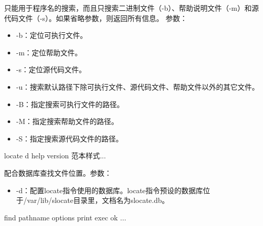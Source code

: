\documentclass[letterpaper,10pt,english]{sphinxmanual}
\begin{document}
只能用于程序名的搜索，而且只搜索二进制文件（-b）、帮助说明文件（-m）和源代码文件（-s）。如果省略参数，则返回所有信息。
参数：
\begin{itemize}
\item {} 
-b：定位可执行文件。

\item {} 
-m：定位帮助文件。

\item {} 
-s：定位源代码文件。

\item {} 
-u：搜索默认路径下除可执行文件、源代码文件、帮助文件以外的其它文件。

\item {} 
-B：指定搜索可执行文件的路径。

\item {} 
-M：指定搜索帮助文件的路径。

\item {} 
-S：指定搜索源代码文件的路径。

\end{itemize}


%
\begin{sphinxVerbatim}[commandchars=\\\{\}]
locate \PYG{o}{[}\PYGZhy{}d\PYG{o}{]} \PYG{o}{[}\PYGZhy{}\PYGZhy{}help\PYG{o}{]} \PYG{o}{[}\PYGZhy{}\PYGZhy{}version\PYG{o}{]} \PYG{o}{[}范本样式...\PYG{o}{]}
\end{sphinxVerbatim}

配合数据库查找文件位置。参数：
\begin{itemize}
\item {} 
-d：配置locate指令使用的数据库。locate指令预设的数据库位于/var/lib/slocate目录里，文档名为slocate.db。

\end{itemize}


%
\begin{sphinxVerbatim}[commandchars=\\\{\}]
find pathname \PYGZhy{}options \PYG{o}{[}\PYGZhy{}print \PYGZhy{}exec \PYGZhy{}ok ...\PYG{o}{]}
\end{sphinxVerbatim}
\end{document}
